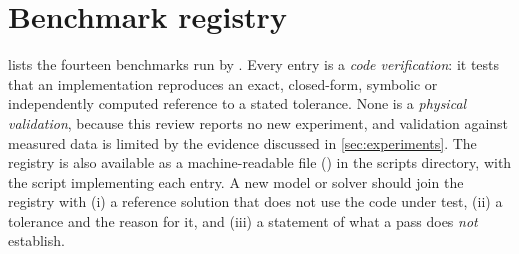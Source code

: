 \section{Benchmark registry}\label{app:registry}
 lists the fourteen benchmarks run by . Every entry is a \emph{code verification}: it tests that an implementation reproduces an exact, closed-form, symbolic or independently computed reference to a stated tolerance. None is a \emph{physical validation}, because this review reports no new experiment, and validation against measured data is limited by the evidence discussed in \cref{sec:experiments}. The registry is also available as a machine-readable file () in the scripts directory, with the script implementing each entry. A new model or solver should join the registry with (i) a reference solution that does not use the code under test, (ii) a tolerance and the reason for it, and (iii) a statement of what a pass does \emph{not} establish.

